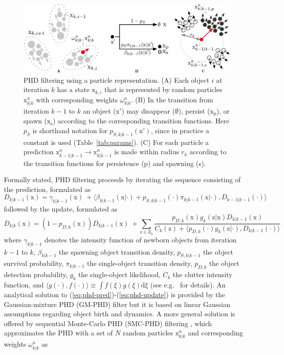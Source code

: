 \begin{figure}
	\centering
	\includegraphics[width=.9\linewidth]{fig2}
	\caption{PHD filtering using a particle representation. (A) Each object $i$ at iteration $k$ has a state $\mathrm{x}_{k,i}$ that is represented by random particles $\mathrm{x}_{k|k}^{n}$ with corresponding weights $\omega_{k|k}^{n}$. (B) In the transition from iteration $k-1$ to $k$ an object ($\mathrm{x}'$) may disappear ($\emptyset$), persist ($\mathrm{x}_{\mathrm{p}}$), or spawn ($\mathrm{x}_{\mathrm{s}}$) according to the corresponding transition functions. Here $p_S$ is shorthand notation for $p_{S,k|k-1}(\mathrm{x}')$, since in practice a constant is used (Table~\ref{tab:params}). (C) For each particle a prediction $\mathrm{x}_{k-1|k-1}^n \rightarrow \mathrm{x}_{k|k-1}^n$ is made within radius $r_k$ according to the transition functions for persistence (p) and spawning (s).}
	\label{fig2}
\end{figure}
Formally stated, PHD filtering proceeds by iterating the sequence consisting of the prediction, formulated as
\begin{equation}
D_{k|k-1}(\mathrm{x}) = \gamma_{k|k-1}(\mathrm{x})\ + 
\langle \beta_{k|k-1}(\mathrm{x}|\cdot) + p_{S,k|k-1}(\cdot)\pi_{k|k-1}(\mathrm{x}|\cdot),D_{k-1|k-1}(\cdot) \rangle
\label{eq:phd-pred}
\end{equation}
followed by the update, formulated as
\begin{equation}
D_{k|k}(\mathrm{x}) = (1-p_{D,k}(\mathrm{x})) D_{k|k-1}(\mathrm{x})\ +
\sum\limits_{\mathrm{z}\in\mathrm{Z}_k}\!\frac{p_{D,k}(\mathrm{x})g_k(\mathrm{z}|\mathrm{x}) D_{k|k-1}(\mathrm{x}) }{C_k(\mathrm{z})+\langle p_{D,k}(\cdot)g_k(\mathrm{z}|\cdot),D_{k|k-1}(\cdot) \rangle}
\label{eq:phd-update}
\end{equation}
where $\gamma_{k|k-1}$ denotes the intensity function of newborn objects from iteration $k-1$ to $k$, $\beta_{k|k-1}$ the spawning object transition density, $p_{S,k|k-1}$ the object survival probability, $\pi_{k|k-1}$ the single-object transition density, $p_{D,k}$ the object detection probability, $g_k$ the single-object likelihood, $C_k$ the clutter intensity function, and $\langle g(\cdot),f(\cdot) \rangle \equiv \int\!f(\xi)g(\xi)\mathrm{d}\xi$ (see e.g.\ \cite{vo2006gaussian} for details). An analytical solution to (\ref{eq:phd-pred})-(\ref{eq:phd-update}) is provided by the Gaussian-mixture PHD (GM-PHD) filter \cite{vo2006gaussian} but it is based on linear Gaussian assumptions regarding object birth and dynamics. A more general solution is offered by sequential Monte-Carlo PHD (SMC-PHD) filtering \cite{vo2005sequential, ristic2010improved, zajic2003particle}, which approximates the PHD with a set of $N$ random particles $\mathrm{x}_{k|k}^{n}$ and corresponding weights $\omega_{k|k}^{n}$ as
